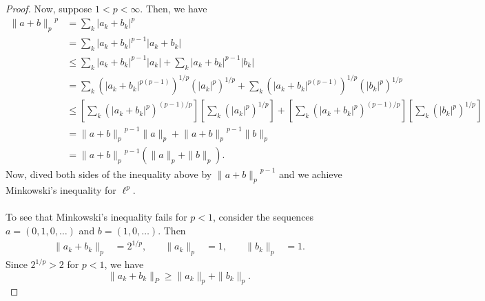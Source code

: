 \begin{proof}
Now, suppose $1<p<\infty$. Then, we have
\begin{align*}
{\|a+b\|_p}^p
&=\sum_k|a_k+b_k|^p\\
&=\sum_k|a_k+b_k|^{p-1}|a_k+b_k|\\
&\leq\sum_k|a_k+b_k|^{p-1}|a_k|+\sum_k|a_k+b_k|^{p-1}|b_k|\\
&=\sum_k\left(|a_k+b_k|^{p(p-1)}\right)^{1/p}{(|a_k|^p)}^{1/p}
+\sum_k\left(|a_k+b_k|^{p(p-1)}\right)^{1/p}{(|b_k|^{p})}^{1/p}\\
&\leq\left[\sum_k\left(|a_k+b_k|^p\right)^{(p-1)/p}\right]
\left[\sum_k{(|a_k|^p)}^{1/p}\right]
+\left[\sum_k\left(|a_k+b_k|^{p}\right)^{(p-1)/p}\right]
\left[\sum_k{(|b_k|^{p})}^{1/p}\right]\\
&={\|a+b\|_p}^{p-1}\|a\|_p+{\|a+b\|_p}^{p-1}\|b\|_p\\
&={\|a+b\|_p}^{p-1}\left(\|a\|_p+\|b\|_p\right).
\end{align*}
Now, dived both sides of the inequality above by ${\|a+b\|_p}^{p-1}$ and we
achieve Minkowski's inequality for $\ell^p$.
\\\\
To see that Minkowski's inequality fails for $p<1$, consider the sequences
$a=(0,1,0,\dotsc)$ and $b=(1,0,\dotsc)$. Then
\[
\begin{aligned}
\|a_k+b_k\|_p&=2^{1/p},\quad&\|a_k\|_p&=1,\quad&\|b_k\|_p&=1.
\end{aligned}
\]
Since $2^{1/p}>2$ for $p<1$, we have
\[
\|a_k+b_k\|_P\geq\|a_k\|_p+\|b_k\|_p.
\]
\end{proof}
\newpage

